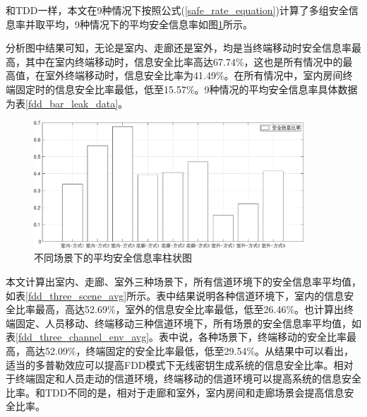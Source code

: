 \documentclass[master]{seuthesis} %
\begin{document}
\begin{Main}
和TDD一样，本文在9种情况下按照公式(\ref{safe_rate_equation})计算了多组安全信息率并取平均，9种情况下的平均安全信息率如图\ref{fdd_bar_leak}所示。

分析图中结果可知，无论是室内、走廊还是室外，均是当终端移动时安全信息率最高，其中在室内终端移动时，信息安全比率高达67.74\%，这也是所有情况中的最高值，在室外终端移动时，信息安全比率为41.49\%。在所有情况中，室内房间终端固定时的信息安全比率最低，低至15.57\%。9种情况的平均安全信息率具体数据为表\ref{fdd_bar_leak_data}。


\begin{figure}[htbp!]
    \centering \includegraphics[width=0.9\textwidth]{images/fdd-leak/bar.eps}
    \caption{不同场景下的平均安全信息率柱状图}
    \label{fdd_bar_leak}
\end{figure}

\begin{table}[htbp] %
    \centering
    \caption{不同场景下的平均安全信息率数值
    \label{fdd_bar_leak_data}}
\end{table}


本文计算出室内、走廊、室外三种场景下，所有信道环境下的安全信息率平均值，如表\ref{fdd_three_scene_avg}所示。表中结果说明各种信道环境下，室内的信息安全比率最高，高达52.69\%，室外的信息安全比率最低，低至26.46\%。也计算出终端固定、人员移动、终端移动三种信道环境下，所有场景的安全信息率平均值，如表\ref{fdd_three_channel_env_avg}。表中说，各种场景下，终端移动的安全比率最高，高达52.09\%，终端固定的安全比率最低，低至29.54\%。从结果中可以看出，适当的多普勒效应可以提高FDD模式下无线密钥生成系统的信息安全比率。相对于终端固定和人员走动的信道环境，终端移动的信道环境可以提高系统的信息安全比率。和TDD不同的是，相对于走廊和室外，室内房间和走廊场景会提高信息安全比率。


\end{Main}
\end{document}
